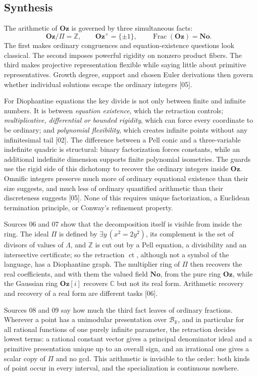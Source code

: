 \documentclass[11pt,oneside]{article}
\numberwithin{equation}{section}
\theoremstyle{definition}
\theoremstyle{remark}
\newcommand{\No}{\mathbf{No}}
\newcommand{\Oz}{\mathbf{Oz}}
\newcommand{\Z}{\mathbb Z}
\newcommand{\R}{\mathbb R}
\newcommand{\C}{\mathbb C}
\newcommand{\BR}{\mathcal B_{\R}}
\newcommand{\ct}{\operatorname{ct}}
\newcommand{\Frac}{\operatorname{Frac}}
\newcommand{\src}[1]{\textup{\textsf{\small[#1]}}}
\newcommand{\Og}{\Oz[i]}
\begin{document}
\subsection{Synthesis}

The arithmetic of $\Oz$ is governed by three simultaneous facts:
\[
 \Oz/\Pi=\Z,\qquad \Oz^\times=\{\pm1\},\qquad\Frac(\Oz)=\No.
\]
The first makes ordinary congruences and equation-existence questions look
classical. The second imposes powerful rigidity on nonzero product fibers.
The third makes projective representation flexible while saying little about
primitive representatives. Growth degree, support and chosen Euler
derivations then govern whether individual solutions escape the ordinary
integers \src{05}.

For Diophantine equations the key divide is not only between finite and
infinite numbers. It is between \emph{equation existence}, which the
retraction controls; \emph{multiplicative, differential or bounded
rigidity}, which can force every coordinate to be ordinary; and
\emph{polynomial flexibility}, which creates infinite points without any
infinitesimal tail \src{02}. The difference between a Pell conic and a
three-variable indefinite quadric is structural: binary factorization forces
constants, while an additional indefinite dimension supports finite
polynomial isometries. The guards use the rigid side of this dichotomy to
recover the ordinary integers inside $\Oz$. Omnific integers preserve much
more of ordinary equational existence than their size suggests, and much less
of ordinary quantified arithmetic than their discreteness suggests
\src{05}. None of this requires unique factorization, a Euclidean termination
principle, or Conway's refinement property.

Sources 06 and 07 show that the decomposition itself is visible from inside
the ring. The ideal $\Pi$ is defined by $\exists y\,(x^2=2y^2)$, its complement is
the set of divisors of values of $\Lambda$, and $\Z$ is cut out by a Pell
equation, a divisibility and an intersective certificate; so the retraction
$\ct$, although not a symbol of the language, has a Diophantine graph. The
multiplier ring of $\Pi$ then recovers the real coefficients, and with them the
valued field $\No$, from the pure ring $\Oz$, while the Gaussian ring $\Og$
recovers $\C$ but not its real form. Arithmetic recovery and recovery of a real
form are different tasks \src{06}.

Sources 08 and 09 say how much the third fact leaves of ordinary fractions.
Wherever a point has a unimodular presentation over $\BR$, and in particular
for all rational functions of one purely infinite parameter, the retraction
decides lowest terms: a rational constant vector gives a principal denominator
ideal and a primitive presentation unique up to an overall sign, and an
irrational one gives a
scalar copy of $\Pi$ and no gcd. This arithmetic is invisible to the order:
both kinds of point occur in every interval, and the specialization is
continuous nowhere.
\end{document}

